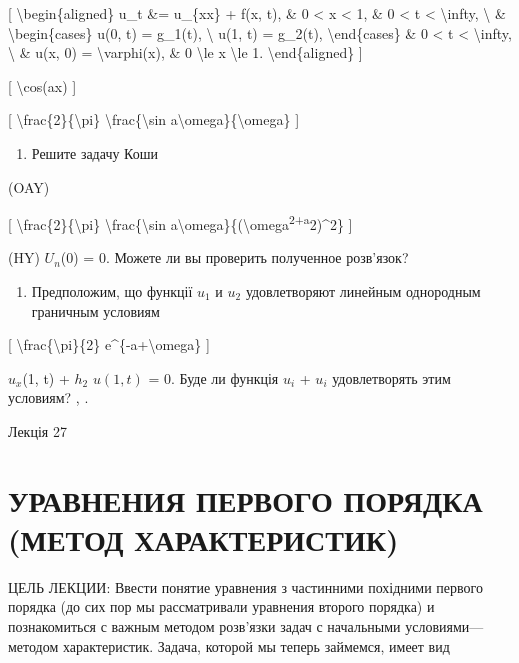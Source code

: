 \documentclass[
]{article}
\providecommand{\tightlist}{%
  \setlength{\itemsep}{0pt}\setlength{\parskip}{0pt}}
\begin{document}
{[} \textbackslash begin\{aligned\} u\_t \&= u\_\{xx\} + f(x, t), \& 0
\textless{} x \textless{} 1, \& 0 \textless{} t \textless{}
\textbackslash infty, \textbackslash{} \& \textbackslash begin\{cases\}
u(0, t) = g\_1(t), \textbackslash{} u(1, t) = g\_2(t),
\textbackslash end\{cases\} \& 0 \textless{} t \textless{}
\textbackslash infty, \textbackslash{} \& u(x, 0) =
\textbackslash varphi(x), \& 0 \textbackslash le x \textbackslash le 1.
\textbackslash end\{aligned\} {]}

{[} \textbackslash cos(ax) {]}

{[} \textbackslash frac\{2\}\{\textbackslash pi\}
\textbackslash frac\{\textbackslash sin
a\textbackslash omega\}\{\textbackslash omega\} {]}

\begin{enumerate}
\def\labelenumi{\arabic{enumi}.}
\setcounter{enumi}{4}
\tightlist
\item
  Решите задачу Коши
\end{enumerate}

(OAY)

{[} \textbackslash frac\{2\}\{\textbackslash pi\}
\textbackslash frac\{\textbackslash sin
a\textbackslash omega\}\{(\textbackslash omega\textsuperscript{2+a}2)\^{}2\}
{]}

(HY) \(U_n\)(0) = 0. Можете ли вы проверить полученное розв'язок?

\begin{enumerate}
\def\labelenumi{\arabic{enumi}.}
\setcounter{enumi}{5}
\tightlist
\item
  Предположим, що функції \(u_1\) и \(u_2\) удовлетворяют линейным
  однородным граничным условиям
\end{enumerate}

{[} \textbackslash frac\{\textbackslash pi\}\{2\}
e\^{}\{-a+\textbackslash omega\} {]}

\(u_x\)(1, t) + \(h_2\) \(u(1, t)\) = 0. Буде ли функція \(u_i\) +
\(u_i\) удовлетворять этим условиям? , .

Лекція 27

\section{УРАВНЕНИЯ ПЕРВОГО ПОРЯДКА (МЕТОД
ХАРАКТЕРИСТИК)}\label{ux443ux440ux430ux432ux43dux435ux43dux438ux44f-ux43fux435ux440ux432ux43eux433ux43e-ux43fux43eux440ux44fux434ux43aux430-ux43cux435ux442ux43eux434-ux445ux430ux440ux430ux43aux442ux435ux440ux438ux441ux442ux438ux43a}

ЦЕЛЬ ЛЕКЦИИ: Ввести понятие уравнения з частинними похідними первого
порядка (до сих пор мы рассматривали уравнения второго порядка) и
познакомиться с важным методом розв'язки задач с начальными
условиями---методом характеристик. Задача, которой мы теперь займемся,
имеет вид
\end{document}
